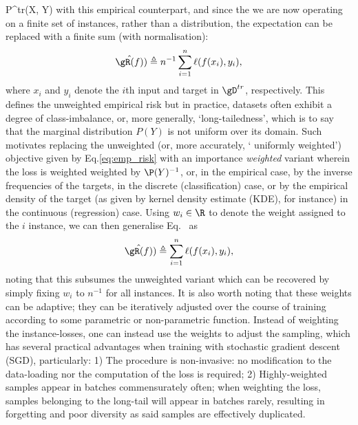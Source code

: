 P^{tr}(X, Y) \) with this empirical counterpart, and since the we are now operating on a finite set
of instances, rather than a distribution, the expectation can be replaced with a
finite sum (with normalisation):
%
\equ\begin{equation*} \label{eq:emp_risk}
  \hat{\gR(f)}) \triangleq n^{-1} \sum_{i=1}^n \ell (f(x_i), y_i),
\end{equation*}
%
where \(x_i\) and \(y_i\) denote the \(i\)th input and target in \( \gD^{tr} \), respectively.
%
This defines the unweighted empirical risk but in practice, datasets often exhibit a degree of
class-imbalance, or, more generally, `long-tailedness', which is to say that the marginal
distribution \( P(Y) \) is not uniform over its domain.
%
Such motivates replacing the unweighted (or, more accurately, ` uniformly weighted') objective given
by Eq.\ref{eq:emp_risk} with an importance  \emph{weighted} variant wherein the loss is weighted
weighted by \( \P(Y)^{-1} \), or, in the empirical case, by the inverse frequencies of the targets,
in the discrete (classification) case, or by the empirical density of the target (as given by
kernel density estimate (KDE), for instance) in the continuous (regression) case.
%
Using \( w_i \in \R \) to denote the weight assigned to the \(i\) instance, we can then generalise
Eq.~\cite{eq:emp_risk} as
%
\equ\begin{equation*} \label{eq:emp_risk_weighted}
  \hat{\gR(f)}) \triangleq \sum_{i=1}^n \ell (f(x_i), y_i),
\end{equation*}
%
noting that this subsumes the unweighted variant which can be recovered by simply fixing \(w_i\) to
\(n^{-1}\) for all instances.
%
It is also worth noting that these weights can be adaptive; they can be iteratively
adjusted over the course of training according to some parametric or non-parametric function.
%
Instead of weighting the instance-losses, one can instead use the weights to adjust the sampling,
which has several practical advantages when training with stochastic gradient descent (SGD),
particularly: 
%
1) The procedure is non-invasive: no modification to the data-loading nor the
computation of the loss is required;
%
2) Highly-weighted samples appear in batches commensurately often; when weighting the loss, samples
belonging to the long-tail will appear in batches rarely, resulting in forgetting and poor
diversity as said samples are effectively duplicated.



